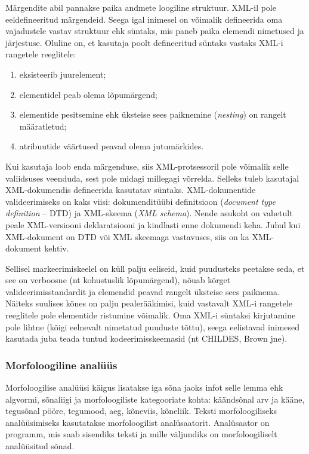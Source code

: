 \documentclass[12pt]{article}
\begin{document}
Märgendite abil pannakse paika andmete loogiline struktuur. XML-il pole eeldefineeritud märgendeid. Seega igal inimesel on võimalik defineerida oma vajadustele vastav struktuur ehk süntaks, mis paneb paika elemendi nimetused ja järjestuse. Oluline on, et kasutaja poolt defineeritud süntaks vastaks XML-i rangetele reeglitele:

\begin{enumerate}
    \item eksisteerib juurelement;
    \item elementidel peab olema lõpumärgend;
    \item elementide pesitsemine ehk üksteise sees paiknemine (\emph{nesting}) on rangelt määratletud;
    \item atribuutide väärtused peavad olema jutumärkides.
    \citep{XML}
\end{enumerate}

Kui kasutaja loob enda märgenduse, siis XML-protsessoril pole võimalik selle valiidsuses veenduda, sest pole midagi millegagi võrrelda. Selleks tuleb kasutajal XML-dokumendis defineerida kasutatav süntaks. XML-dokumentide valideerimiseks on kaks viisi: dokumenditüübi definitsioon (\emph{document type definition} -- DTD) ja XML-skeema (\emph{XML schema}). Nende asukoht on vahetult peale XML-versiooni deklaratsiooni ja kindlasti enne dokumendi keha. Juhul kui XML-doku\-ment on DTD või XML skeemaga vastavuses, siis on ka XML-dokument kehtiv. \citep{XML}

Sellisel markeerimiskeelel on küll palju eeliseid, kuid puudusteks peetakse seda, et see on verboosne (nt kohustuslik lõpumärgend), nõuab kõrget valideerimisstandardit ja elemendid peavad rangelt üksteise sees paiknema. Näiteks suulises kõnes on palju pealerääkimisi, kuid vastavalt XML-i rangetele reeglitele pole elementide ristumine võimalik. Oma XML-i süntaksi kirjutamine pole lihtne (kõigi eelnevalt nimetatud puuduste tõttu), seega eelistavad inimesed kasutada juba teada tuntud kodeerimisskeemasid (nt CHILDES, Brown jne). \citep{LEECH}

\subsubsection{Morfoloogiline analüüs}

Morfoloogilise analüüsi käigus lisatakse iga sõna jaoks infot selle lemma ehk algvormi, sõnaliigi ja morfoloogiliste kategooriate kohta: käändsõnal arv ja kääne, tegusõnal pööre, tegumood, aeg, kõneviis, kõneliik. Teksti morfoloogiliseks analüüsimiseks kasutatakse morfoloogilist analüsaatorit. Analüsaator on programm, mis saab sisendiks teksti ja mille väljundiks on morfoloogiliselt analüüsitud sõnad. \citep[89]{KV}
\end{document}
